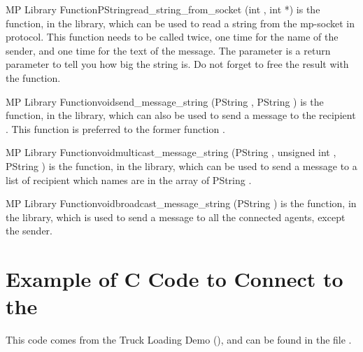 \begin{typefn}{MP Library Function}{PString}{read\_string\_from\_socket}
        {(int , int *)}
is the function, in the  library, which can be used to read a
string from the mp-socket in  protocol. This function needs to be
called twice, one time for the name of the sender, and one time for the text of
the message. The  parameter is a return parameter to tell you how big
the string is.  Do not forget to free the result with the  function.
\end{typefn}

\begin{typefn}{MP Library Function}{void}{send\_message\_string}
        {(PString , PString )}
is the function, in the  library, which can also be used to
send a message  to the recipient . This function
 is preferred to the former function
.
\end{typefn}

\begin{typefn}{MP Library Function}{void}{multicast\_message\_string}
        {(PString , unsigned int , PString )}
is the function, in the  library, which can be used to
send a message  to  a list of  recipient which names
are in the array of PString . 
\end{typefn}

\begin{typefn}{MP Library Function}{void}{broadcast\_message\_string}
        {(PString )}
is the function, in the  library, which is used to send a message
 to  all the connected agents, except the sender.  
\end{typefn}

\section{Example of C Code to Connect to the \MPA{}}

This code comes from the Truck Loading Demo (), and
can be found in the file .

